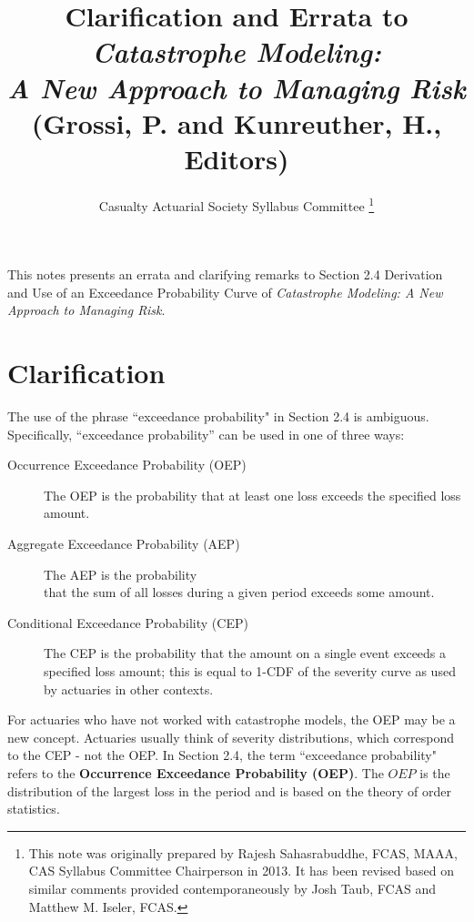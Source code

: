 \documentclass[]{article}
\title{Clarification and Errata to \\\textit{Catastrophe Modeling: \\A New Approach to Managing Risk} \\(Grossi, P. and Kunreuther, H., Editors)}
\author{Casualty Actuarial Society Syllabus Committee \thanks{This note was originally prepared by Rajesh Sahasrabuddhe, FCAS, MAAA, CAS Syllabus Committee Chairperson in 2013. It has been revised based on similar comments provided contemporaneously by Josh Taub, FCAS and Matthew M. Iseler, FCAS.} } %
\begin{document}
\maketitle

\begin{abstract}

\end{abstract}
This notes presents an errata and clarifying remarks to Section 2.4 Derivation and Use of an Exceedance Probability Curve of \textit{Catastrophe Modeling: A New Approach to Managing Risk}.
\section{Clarification}
The use of the phrase ``exceedance probability" in Section 2.4 is ambiguous.  Specifically, “exceedance probability” can be used in one of three ways:
\begin{description}
\item[Occurrence Exceedance Probability (OEP)] The OEP is the probability that at least one loss exceeds the specified loss amount.
\item[Aggregate Exceedance Probability (AEP)] The AEP is the probability \\that the sum of all losses during a given period exceeds some amount.
\item[Conditional Exceedance Probability (CEP)] The CEP is the probability that the amount on a single event exceeds a specified loss amount; this is equal to 1-CDF of the severity curve as used by actuaries in other contexts.
\end{description}

For actuaries who have not worked with catastrophe models, the OEP may be a new concept.  Actuaries usually think of severity distributions, which correspond to the CEP - not the OEP.  In Section 2.4, the term ``exceedance probability" refers to the \textbf{Occurrence Exceedance Probability (OEP)}. The $OEP$ is the distribution of the largest loss in the period and is based on the theory of order statistics.
\end{document}
